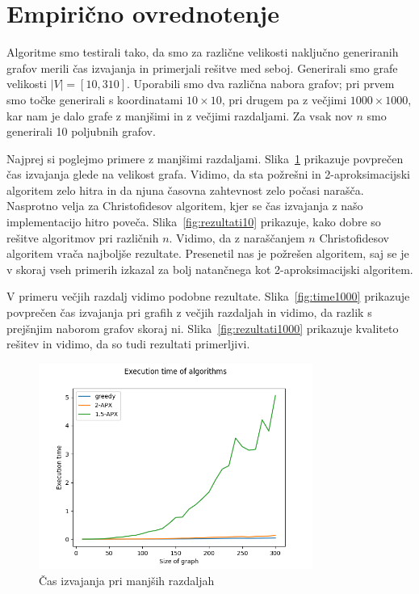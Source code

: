 \documentclass{article}
\begin{document}
\section{Empirično ovrednotenje}

Algoritme smo testirali tako, da smo za različne velikosti naključno generiranih
grafov merili čas izvajanja in primerjali rešitve med seboj. Generirali smo
grafe velikosti $|V| = [10, 310]$. Uporabili smo dva različna nabora grafov; pri
prvem smo točke generirali s koordinatami $10 \times 10$, pri drugem pa z
večjimi $1000 \times 1000$, kar nam je dalo grafe z manjšimi in z večjimi
razdaljami. Za vsak nov $n$ smo generirali 10 poljubnih grafov.

Najprej si poglejmo primere z manjšimi razdaljami. Slika~\ref{fig:time10}
prikazuje povprečen čas izvajanja glede na velikost grafa. Vidimo, da sta
požrešni in 2-aproksimacijski algoritem zelo hitra in da njuna časovna
zahtevnost zelo počasi narašča. Nasprotno velja za Christofidesov algoritem,
kjer se čas izvajanja z našo implementacijo hitro
poveča. Slika~\ref{fig:rezultati10} prikazuje, kako dobre so rešitve algoritmov
pri različnih $n$. Vidimo, da z naraščanjem $n$ Christofidesov algoritem vrača
najboljše rezultate. Presenetil nas je požrešen algoritem, saj se je v skoraj
vseh primerih izkazal za bolj natančnega kot 2-aproksimacijski algoritem.

V primeru večjih razdalj vidimo podobne rezultate. Slika~\ref{fig:time1000}
prikazuje povprečen čas izvajanja pri grafih z večjih razdaljah in vidimo, da
razlik s prejšnjim naborom grafov skoraj ni. Slika~\ref{fig:rezultati1000}
prikazuje kvaliteto rešitev in vidimo, da so tudi rezultati primerljivi.

\begin{figure}
	\centering
	\includegraphics[width = 0.8\textwidth]{figs/time10.png}
	\caption{Čas izvajanja pri manjših razdaljah}
	\label{fig:time10}
\end{figure}
\end{document}
